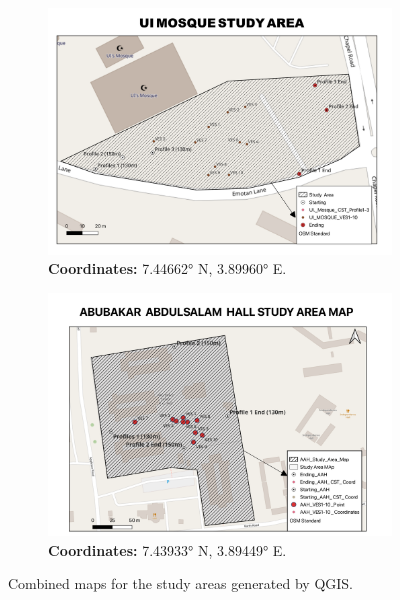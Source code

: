\documentclass[12pt,a4paper]{report}
\begin{document}
\begin{figure}[H]
    \centering
    \begin{subfigure}[t]{0.9\textwidth}
        \centering
        \includegraphics[width=\textwidth]{UI_Mosque_Map_Layout.png}
        \caption{\textbf{Coordinates:} 7.44662° N, 3.89960° E.}
        \label{fig:UI Mosque Study Area}
    \end{subfigure} 
    \begin{subfigure}[t]{1.0\textwidth}
        \centering
        \includegraphics[width=\textwidth]{AAH_Map_Layout.png}
        \caption{\textbf{Coordinates:} 7.43933° N, 3.89449° E.}
        \label{fig:AAH Study Area}
    \end{subfigure}
    \caption{Combined maps for the study areas generated by QGIS.}
    \label{fig:Combined Study Areas}
\end{figure}
\end{document}
